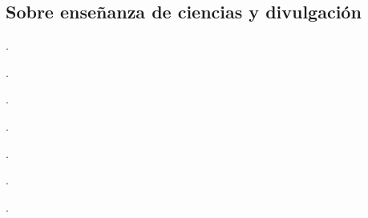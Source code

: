 \begin{etaremune}
\end{etaremune}

\subsection{Sobre enseñanza de ciencias y divulgación}
\begin{etaremune}
	\item {}.
	\item {}.
	\item {}.
	\item {}.
	\item {}.
	\item {}.
	\item {}.
\end{etaremune}
